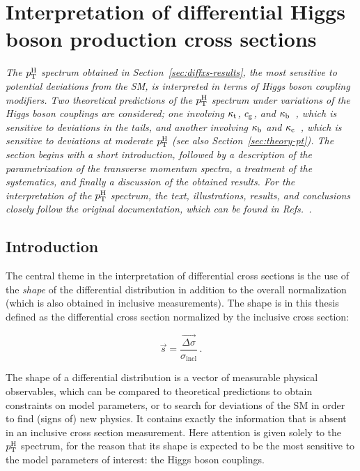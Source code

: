 \section{Interpretation of differential Higgs boson production cross sections}
\label{sec:interpretation}

\emph{%
The $p_\mathrm{T}^\mathrm{H}$ spectrum obtained in Section~\ref{sec:diffxs-results}, the most sensitive to potential deviations from the SM, is interpreted in terms of Higgs boson coupling modifiers.
% 
Two theoretical predictions of the $p_\mathrm{T}^\mathrm{H}$ spectrum under variations of the Higgs boson couplings are considered; one involving $\kappa_{\mathrm{t}}$, $c_\mathrm{g}$, and $\kappa_{\mathrm{b}}$~\cite{Grazzini:2017szg,Grazzini:2016paz}, which is sensitive to deviations in the tails, and another involving $\kappa_{\mathrm{b}}$ and $\kappa_{\mathrm{c}}$~\cite{Bishara:2016jga}, which is sensitive to deviations at moderate $p_\mathrm{T}^\mathrm{H}$ (see also Section~\ref{sec:theory-pt}).
% 
The section begins with a short introduction, followed by a description of the parametrization of the transverse momentum spectra, a treatment of the systematics, and finally a discussion of the obtained results.
% 
For the interpretation of the $p_\mathrm{T}^\mathrm{H}$ spectrum, the text, illustrations, results, and conclusions closely follow the original documentation, which can be found in Refs.~\cite{AN-17-244,HIG-17-028}.
}


\subsection{Introduction}

The central theme in the interpretation of differential cross sections is the use of the \emph{shape} of the differential distribution in addition to the overall normalization (which is also obtained in inclusive measurements).
% 
The shape is in this thesis defined as the differential cross section normalized by the inclusive cross section:
% 
\begin{linenomath*}
\begin{equation}
\label{eq:interpretation-shape}
\vec{s} = \frac{\vec{\Delta\sigma}}{\sigma_\text{incl}}
\,.
\end{equation}
\end{linenomath*}
% 
The shape of a differential distribution is a vector of measurable physical observables, which can be compared to theoretical predictions to obtain constraints on model parameters, or to search for deviations of the SM in order to find (signs of) new physics.
% 
It contains exactly the information that is absent in an inclusive cross section measurement.
% 
Here attention is given solely to the $p_\mathrm{T}^\mathrm{H}$ spectrum, for the reason that its shape is expected to be the most sensitive to the model parameters of interest: the Higgs boson couplings.


